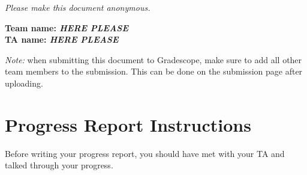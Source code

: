 \emph{Please make this document anonymous.}

\textbf{Team name: \emph{HERE PLEASE}}\\
\textbf{TA name: \emph{HERE PLEASE}}

\emph{Note:} when submitting this document to Gradescope, make sure to add all other team members to the submission. This can be done on the submission page after uploading.

\section*{Progress Report Instructions}

Before writing your progress report, you should have met with your TA and talked through your progress.

%
% 
%
% 
%
%
%



